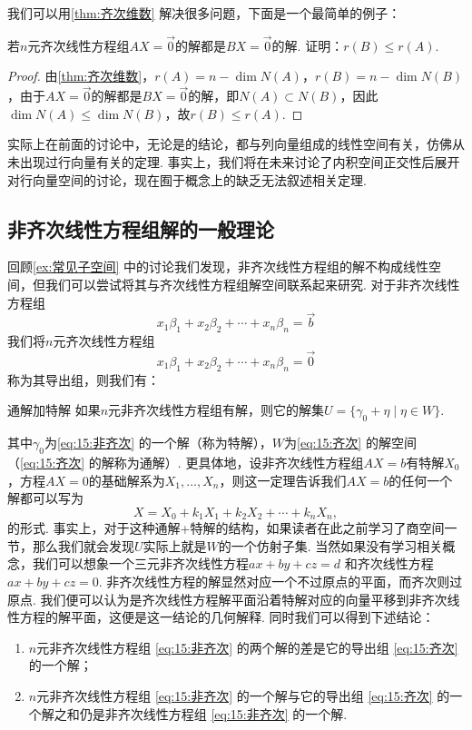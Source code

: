 我们可以用\autoref{thm:齐次维数} 解决很多问题，下面是一个最简单的例子：
\begin{example}{}{}
    若$n$元齐次线性方程组$AX = \vec{0}$的解都是$BX = \vec{0}$的解. 证明：$r(B) \leqslant r(A)$.
\end{example}

\begin{proof}
    由\autoref{thm:齐次维数}，$r(A)=n-\dim N(A)$，$r(B)=n-\dim N(B)$，由于$AX=\vec{0}$的解都是$BX=\vec{0}$的解，即$N(A) \subset N(B)$，因此$\dim N(A) \leqslant \dim N(B)$，故$r(B) \leqslant r(A)$.
\end{proof}

实际上在前面的讨论中，无论是的结论，都与列向量组成的线性空间有关，仿佛从未出现过行向量有关的定理. 事实上，我们将在未来讨论了内积空间正交性后展开对行向量空间的讨论，现在囿于概念上的缺乏无法叙述相关定理.

\subsection{非齐次线性方程组解的一般理论}

回顾\autoref{ex:常见子空间} 中的讨论我们发现，非齐次线性方程组的解不构成线性空间，但我们可以尝试将其与齐次线性方程组解空间联系起来研究. 对于非齐次线性方程组
\begin{equation} \label{eq:15:非齐次}
    x_1\beta_1+x_2\beta_2+\cdots+x_n\beta_n=\vec{b}
\end{equation}
我们将$n$元齐次线性方程组
\begin{equation} \label{eq:15:齐次}
    x_1\beta_1+x_2\beta_2+\cdots+x_n\beta_n=\vec{0}
\end{equation}
称为其导出组，则我们有：
\begin{theorem}{}{通解加特解}
    如果$n$元非齐次线性方程组有解，则它的解集$U=\{\gamma_0+\eta \mid \eta \in W\}$.
\end{theorem}
其中$\gamma_0$为\autoref{eq:15:非齐次} 的一个解（称为特解），$W$为\autoref{eq:15:齐次} 的解空间（\autoref*{eq:15:齐次} 的解称为通解）. 更具体地，设非齐次线性方程组$AX=b$有特解$X_0$，方程$AX=0$的基础解系为$X_1,\ldots,X_n$，则这一定理告诉我们$AX=b$的任何一个解都可以写为
\[X=X_0+k_1X_1+k_2X_2+\cdots+k_nX_n,\]
的形式. 事实上，对于这种通解+特解的结构，如果读者在此之前学习了商空间一节，那么我们就会发现$U$实际上就是$W$的一个仿射子集. 当然如果没有学习相关概念，我们可以想象一个三元非齐次线性方程$ax + by + cz = d$ 和齐次线性方程$ax + by + cz = 0$. 非齐次线性方程的解显然对应一个不过原点的平面，而齐次则过原点. 我们便可以认为是齐次线性方程解平面沿着特解对应的向量平移到非齐次线性方程的解平面，这便是这一结论的几何解释. 同时我们可以得到下述结论：
\begin{enumerate}
    \item $n$元非齐次线性方程组 \ref*{eq:15:非齐次} 的两个解的差是它的导出组 \ref*{eq:15:齐次} 的一个解；

    \item $n$元非齐次线性方程组 \ref*{eq:15:非齐次} 的一个解与它的导出组 \ref*{eq:15:齐次} 的一个解之和仍是非齐次线性方程组 \ref*{eq:15:非齐次} 的一个解.
\end{enumerate}

